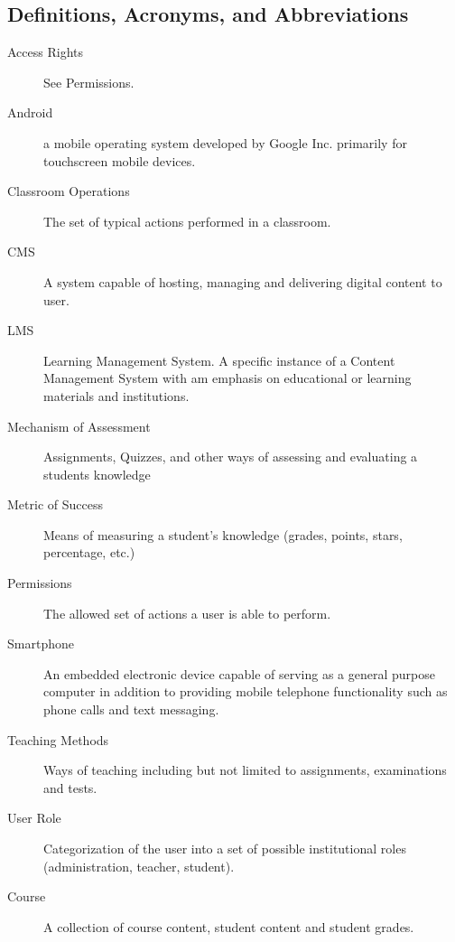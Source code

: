 \documentclass[]{article}
\begin{document}
\subsection{Definitions, Acronyms, and Abbreviations}
\label{sub:definitions_acronyms_and_abbreviations}
\begin{description}
  \item [Access Rights] See Permissions.

  \item [Android] a mobile operating system developed by Google Inc.  primarily
    for touchscreen mobile devices.

  \item [Classroom Operations] The set of typical actions performed in a
    classroom.

  \item [CMS] A system capable of hosting, managing and delivering digital
    content to user.

  \item [LMS] Learning Management System. A specific instance of a Content
    Management System with am emphasis on educational or learning materials and
    institutions.

  \item [Mechanism of Assessment] Assignments, Quizzes, and other ways of
    assessing and evaluating a students knowledge

  \item [Metric of Success] Means of measuring a student's knowledge (grades,
    points, stars, percentage, etc.)

  \item [Permissions] The allowed set of actions a user is able to perform.

  \item [Smartphone] An embedded electronic device capable of serving as a
    general purpose computer in addition to providing mobile telephone
    functionality such as phone calls and text messaging.

  \item [Teaching Methods] Ways of teaching including but not limited to
    assignments, examinations and tests.

  \item [User Role] Categorization of the user into a set of possible
    institutional roles (administration, teacher, student).

	\item [Course] A collection of course content, student content and student grades.


\end{description}
\end{document}
